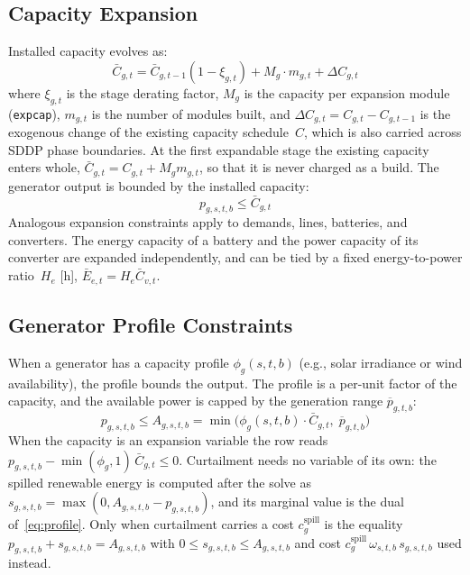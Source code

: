 \subsection{Capacity Expansion}

Installed capacity evolves as:
\begin{equation}
\label{eq:capacity}
\bar{C}_{g,t} = \bar{C}_{g,t-1}(1-\xi_{g,t}) + M_g \cdot m_{g,t}
  + \Delta C_{g,t}
\end{equation}
where $\xi_{g,t}$ is the stage derating factor, $M_g$ is the capacity
per expansion module (\texttt{expcap}), $m_{g,t}$ is the number of
modules built, and $\Delta C_{g,t} = C_{g,t} - C_{g,t-1}$ is the
exogenous change of the existing capacity schedule~$C$, which is also
carried across SDDP phase boundaries.  At the first expandable stage
the existing capacity enters whole, $\bar{C}_{g,t} = C_{g,t} + M_g
m_{g,t}$, so that it is never charged as a build.  The
generator output is bounded by the installed capacity:
\begin{equation}
p_{g,s,t,b} \leq \bar{C}_{g,t}
\end{equation}
Analogous expansion constraints apply to demands, lines, batteries, and
converters.  The energy capacity of a battery and the power capacity of
its converter are expanded independently, and can be tied by a fixed
energy-to-power ratio~$H_e$ [h], $\bar{E}_{e,t} = H_e \bar{C}_{v,t}$.

\subsection{Generator Profile Constraints}

When a generator has a capacity profile $\phi_g(s,t,b)$ (e.g., solar
irradiance or wind availability), the profile bounds the output.  The
profile is a per-unit factor of the capacity, and the available power is
capped by the generation range $\overline{p}_{g,t,b}$:
\begin{equation}
\label{eq:profile}
p_{g,s,t,b} \leq A_{g,s,t,b}
  = \min\bigl(\phi_g(s,t,b) \cdot \bar{C}_{g,t},\;
    \overline{p}_{g,t,b}\bigr)
\end{equation}
When the capacity is an expansion variable the row reads
$p_{g,s,t,b} - \min(\phi_g, 1)\,\bar{C}_{g,t} \leq 0$.  Curtailment
needs no variable of its own: the spilled renewable energy is computed
after the solve as $s_{g,s,t,b} = \max(0, A_{g,s,t,b} - p_{g,s,t,b})$,
and its marginal value is the dual of~\eqref{eq:profile}.  Only when
curtailment carries a cost $c_g^\text{spill}$ is the equality
$p_{g,s,t,b} + s_{g,s,t,b} = A_{g,s,t,b}$ with
$0 \leq s_{g,s,t,b} \leq A_{g,s,t,b}$ and cost
$c_g^\text{spill}\,\omega_{s,t,b}\,s_{g,s,t,b}$ used instead.

